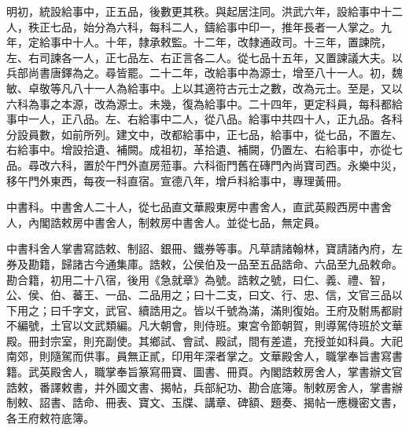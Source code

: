 明初，統設給事中，正五品，後數更其秩。與起居注同。洪武六年，設給事中十二人，秩正七品，始分為六科，每科二人，鑄給事中印一，推年長者一人掌之。九年，定給事中十人。十年，隸承敕監。十二年，改隸通政司。十三年，置諫院，左、右司諫各一人，正七品左、右正言各二人。從七品十五年，又置諫議大夫。以兵部尚書唐鐸為之。尋皆罷。二十二年，改給事中為源士，增至八十一人。初，魏敏、卓敬等凡八十一人為給事中。上以其適符古元士之數，改為元士。至是，又以六科為事之本源，改為源士。未幾，復為給事中。二十四年，更定科員，每科都給事中一人，正八品。左、右給事中二人，從八品。給事中共四十人，正九品。各科分設員數，如前所列。建文中，改都給事中，正七品，給事中，從七品，不置左、右給事中。增設拾遺、補闕。成祖初，革拾遺、補闕，仍置左、右給事中，亦從七品。尋改六科，置於午門外直房蒞事。六科衙門舊在磚門內尚寶司西。永樂中災，移午門外東西，每夜一科直宿。宣德八年，增戶科給事中，專理黃冊。

中書科。中書舍人二十人，從七品直文華殿東房中書舍人，直武英殿西房中書舍人，內閣誥敕房中書舍人，制敕房中書舍人。並從七品，無定員。

中書科舍人掌書寫誥敕、制詔、銀冊、鐵券等事。凡草請諸翰林，寶請諸內府，左券及勘籍，歸諸古今通集庫。誥敕，公侯伯及一品至五品誥命、六品至九品敕命。勘合籍，初用二十八宿，後用《急就章》為號。誥敕之號，曰仁、義、禮、智，公、侯、伯、蕃王、一品、二品用之；曰十二支，曰文、行、忠、信，文官三品以下用之；曰千字文，武官、續誥用之。皆以千號為滿，滿則復始。王府及駙馬都尉不編號，土官以文武類編。凡大朝會，則侍班。東宮令節朝賀，則導駕侍班於文華殿。冊封宗室，則充副使。其鄉試、會試、殿試，間有差遣，充授並如科員。大祀南郊，則隨駕而供事。員無正貳，印用年深者掌之。文華殿舍人，職掌奉旨書寫書籍。武英殿舍人，職掌奉旨篆寫冊寶、圖書、冊頁。內閣誥敕房舍人，掌書辦文官誥敕，番譯敕書，并外國文書、揭帖，兵部紀功、勘合底簿。制敕房舍人，掌書辦制敕、詔書、誥命、冊表、寶文、玉牒、講章、碑額、題奏、揭帖一應機密文書，各王府敕符底簿。

